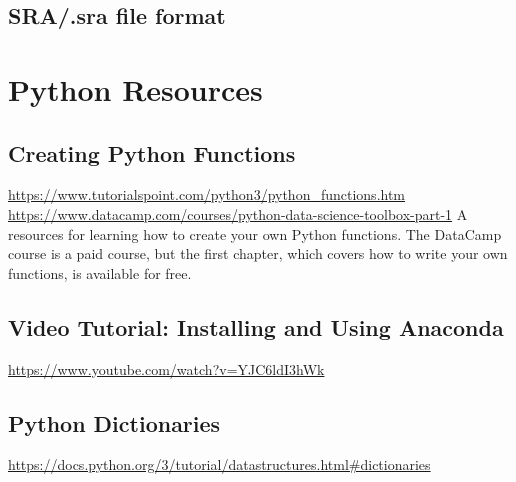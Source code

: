 \begin{fullpage}
    \section{SRA/.sra file format}
    \label{app:sra-format}


%
\chapter{Python Resources}
\label{chap:python-resources}

\section{Creating Python Functions}
\label{appendix:create-func}
\url{https://www.tutorialspoint.com/python3/python_functions.htm}\newline
\url{https://www.datacamp.com/courses/python-data-science-toolbox-part-1}
A resources for learning how to create your own Python functions. The DataCamp course is a paid course, but the first chapter, which covers how to write your own functions, is available for free.


\section{Video Tutorial: Installing and Using Anaconda}
\label{appendix:install-anaconda}
\url{https://www.youtube.com/watch?v=YJC6ldI3hWk}


\section{Python Dictionaries}
\label{appendix:python-dictionaries}
\url{https://docs.python.org/3/tutorial/datastructures.html#dictionaries}


%

\renewcommand{\bibname}{References}
 

\end{fullpage}

%

%



